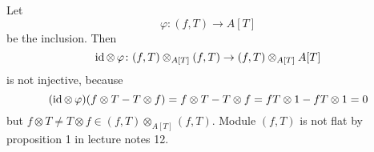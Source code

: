 \newcommand{\sheet}{7}




\maketitle

\begin{exercise}{4}
    Let
    \begin{equation}
        \varphi \colon (f, T) \rightarrow A[T]
    \end{equation}
    be the inclusion. Then
    \begin{equation}
        \operatorname{id} \otimes\,\varphi \colon (f, T) \otimes_{A[T]} (f, T) \rightarrow (f,
        T) \otimes_{A[T]} A[T]
    \end{equation}
    is not injective, because
    \begin{equation}
        (\operatorname{id} \otimes\,\varphi)(f \otimes T - T \otimes f) = f \otimes T - T \otimes f = fT \otimes
        1 - fT \otimes 1 = 0
    \end{equation}
    but $f \otimes T \not= T \otimes f \in (f, T) \otimes_{A[T]} (f, T)$.
    Module $(f, T)$ is not flat by proposition 1 in lecture notes 12.
\end{exercise}


